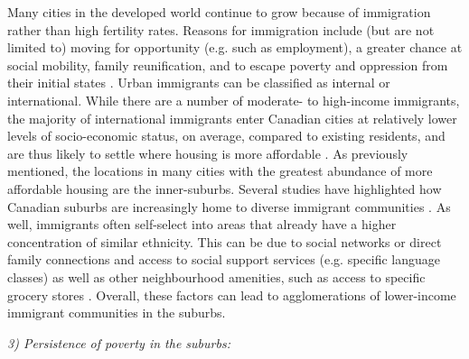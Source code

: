 Many cities in the developed world continue to grow because of immigration rather than high fertility rates. Reasons for immigration include (but are not limited to) moving for opportunity (e.g. such as employment), a greater chance at social mobility, family reunification, and to escape poverty and oppression from their initial states \cite{boyd_100_2000,hagen-zanker_why_2008}. Urban immigrants can be classified as internal or international. While there are a number of moderate- to high-income immigrants, the majority of international immigrants enter Canadian cities at relatively lower levels of socio-economic status, on average, compared to existing residents, and are thus likely to settle where housing is more affordable \cite{kazemipur_invisible_2000}. As previously mentioned, the locations in many cities with the greatest abundance of more affordable housing are the inner-suburbs. Several studies have highlighted how Canadian suburbs are increasingly home to diverse immigrant communities \cite{bourne_are_1989,bourne_changing_2001,grant_changing_2020}. As well, immigrants often self-select into areas that already have a higher concentration of similar ethnicity. This can be due to social networks or direct family connections and access to social support services (e.g. specific language classes) as well as other neighbourhood amenities, such as access to specific grocery stores \cite{zhuang_role_2017,farber_transportation_2018}. Overall, these factors can lead to agglomerations of lower-income immigrant communities in the suburbs.



\textit{3) Persistence of poverty in the suburbs:}



